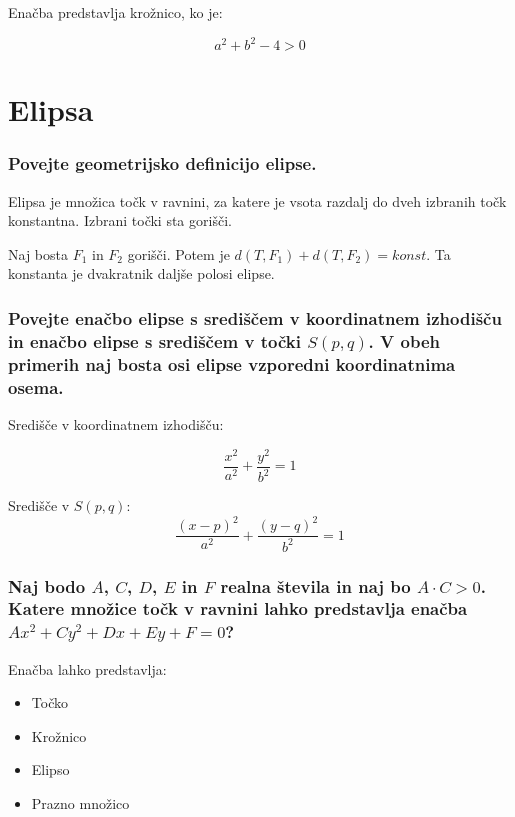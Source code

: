 \documentclass{article}
\begin{document}
\vspace{5mm}

Enačba predstavlja krožnico, ko je:

$$
a^2 + b^2 - 4 > 0
$$

\section{Elipsa}

\subsubsection*{Povejte geometrijsko definicijo elipse.}

Elipsa je množica točk v ravnini, za katere je vsota razdalj do dveh izbranih točk konstantna. Izbrani točki sta gorišči.

\vspace{5mm}

Naj bosta $F_1$ in $F_2$ gorišči. Potem je $d(T, F_1) + d(T, F_2) = konst$. Ta konstanta je dvakratnik daljše polosi elipse.

\subsubsection*{Povejte enačbo elipse s središčem v koordinatnem izhodišču in enačbo elipse s središčem v točki $S(p, q)$. V obeh primerih naj bosta osi elipse vzporedni koordinatnima osema.}

Središče v koordinatnem izhodišču:

$$
\frac{x^2}{a^2} + \frac{y^2}{b^2} = 1
$$

Središče v $S(p, q)$:
$$
\frac{(x-p)^2}{a^2} + \frac{(y-q)^2}{b^2} = 1
$$

\subsubsection*{Naj bodo $A$, $C$, $D$, $E$ in $F$ realna števila in naj bo $A \cdot C>0$. Katere množice točk v ravnini lahko predstavlja enačba $A x^{2}+C y^{2}+D x+E y+F=0$?}

Enačba lahko predstavlja:

\begin{itemize}
  \item Točko
  \item Krožnico
  \item Elipso
  \item Prazno množico
\end{itemize}
\end{document}
